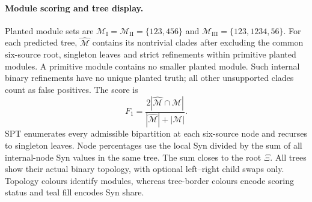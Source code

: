 \documentclass[fleqn,10pt]{wlscirep}
\newcommand{\rev}[1]{\textcolor{red}{#1}}
\begin{document}


\paragraph{Module scoring and tree display.}
Planted module sets are $\mathcal M_{\mathrm I}=\mathcal M_{\mathrm{II}}=\{123,456\}$ and $\mathcal M_{\mathrm{III}}=\{123,1234,56\}$. For each predicted tree, $\widehat{\mathcal M}$ contains its nontrivial clades after excluding the common six-source root, singleton leaves and strict refinements within primitive planted modules. A primitive module contains no smaller planted module. Such internal binary refinements have no unique planted truth; all other unsupported clades count as false positives. The score is
\begingroup
\begin{equation}
F_1=\frac{2|\widehat{\mathcal M}\cap\mathcal M|}{|\widehat{\mathcal M}|+|\mathcal M|}.
\end{equation}
\endgroup
SPT enumerates every admissible bipartition at each six-source node and recurses to singleton leaves. Node percentages use the local Syn divided by the sum of all internal-node Syn values in the same tree. The sum closes to the root $\Xi$. All trees show their actual binary topology, with optional left--right child swaps only. Topology colours identify modules, whereas tree-border colours encode scoring status and teal fill encodes Syn share.
\end{document}
